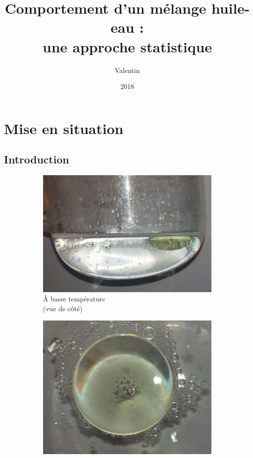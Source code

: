 \documentclass[french]{beamer}
\title[Comportement d'un mélange phénol-eau]{Comportement d'un mélange huile-eau :\\une approche statistique}
\author{Valentin \texorpdfstring{\bsc{Ogier}}{Ogier}}
\date{2018}
\begin{document}
\frame{\titlepage}
 
	
\section{Mise en situation}
\subsection{Introduction}

\begin{frame}
    \begin{figure}
        \centering
       	\begin{subfigure}{0.32\textwidth}
        	\centering
        	\includegraphics[height=0.3\textheight]{assets/bulle/bulle-profil.jpg}
        	\caption{\`A basse température\\(vue de côté)}
        \end{subfigure}
		\begin{subfigure}{0.32\textwidth}
			\centering
			\includegraphics[height=0.3\textheight]{assets/bulle/bulle-coloree.jpg}

\end{subfigure}
\end{figure}
\end{frame}
\end{document}
